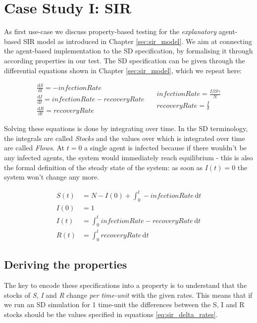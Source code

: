 \section{Case Study I: SIR}
\label{sec:case_SIR}
As first use-case we discuss property-based testing for the \textit{explanatory} agent-based SIR model as introduced in Chapter \ref{sec:sir_model}. We aim at connecting the agent-based implementation to the SD specification, by formalising it through according properties in our test. The SD specification can be given through the differential equations shown in Chapter \ref{sec:sir_model}, which we repeat here:

\begin{equation}
\begin{split}
\frac{\mathrm d S}{\mathrm d t} = -infectionRate \\
\frac{\mathrm d I}{\mathrm d t} = infectionRate - recoveryRate \\
\frac{\mathrm d R}{\mathrm d t} = recoveryRate 
\end{split}
\quad
\begin{split}
infectionRate = \frac{I \beta S \gamma}{N} \\
recoveryRate = \frac{I}{\delta} 
\end{split}
\end{equation}
\label{eq:sir_delta_rates}

Solving these equations is done by integrating over time. In the SD terminology, the integrals are called \textit{Stocks} and the values over which is integrated over time are called \textit{Flows}. At $t = 0$ a single agent is infected because if there wouldn't be any infected agents, the system would immediately reach equilibrium - this is also the formal definition of the steady state of the system: as soon as $I(t) = 0$ the system won't change any more.

\begin{align}
S(t) &= N - I(0) + \int_0^t -infectionRate\, \mathrm{d}t \\
I(0) &= 1 \\
I(t) &= \int_0^t infectionRate - recoveryRate\, \mathrm{d}t \\
R(t) &= \int_0^t recoveryRate\, \mathrm{d}t
\end{align}

\subsection{Deriving the properties}
The key to encode these specifications into a property is to understand that the stocks of \textit{S}, \textit{I} and \textit{R} change \textit{per time-unit} with the given rates. This means that if we run an SD simulation for 1 time-unit the differences between the S, I and R stocks should be the values specified in equations \ref{eq:sir_delta_rates}. %

